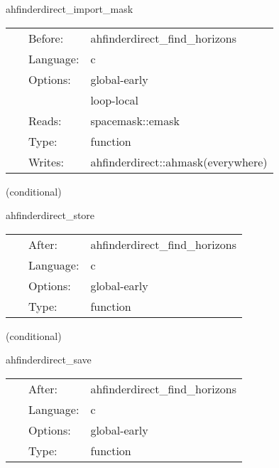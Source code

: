 \hspace{5mm} ahfinderdirect\_import\_mask 

\hspace{5mm}{\it import the excision mask } 


\hspace{5mm}

 \begin{tabular*}{160mm}{cll} 
~ & Before:  & ahfinderdirect\_find\_horizons \\ 
~ & Language:  & c \\ 
~ & Options:  & global-early \\ 
~& ~ &loop-local\\ 
~ & Reads:  & spacemask::emask \\ 
~ & Type:  & function \\ 
~ & Writes:  & ahfinderdirect::ahmask(everywhere) \\ 
\end{tabular*} 


\vspace{5mm}

   (conditional) 

\hspace{5mm} ahfinderdirect\_store 

\hspace{5mm}{\it store apparent horizon(s) into spherical surface(s) } 


\hspace{5mm}

 \begin{tabular*}{160mm}{cll} 
~ & After:  & ahfinderdirect\_find\_horizons \\ 
~ & Language:  & c \\ 
~ & Options:  & global-early \\ 
~ & Type:  & function \\ 
\end{tabular*} 


\vspace{5mm}

   (conditional) 

\hspace{5mm} ahfinderdirect\_save 

\hspace{5mm}{\it save apparent horizon(s) into cactus variables } 


\hspace{5mm}

 \begin{tabular*}{160mm}{cll} 
~ & After:  & ahfinderdirect\_find\_horizons \\ 
~ & Language:  & c \\ 
~ & Options:  & global-early \\ 
~ & Type:  & function \\ 
\end{tabular*} 


